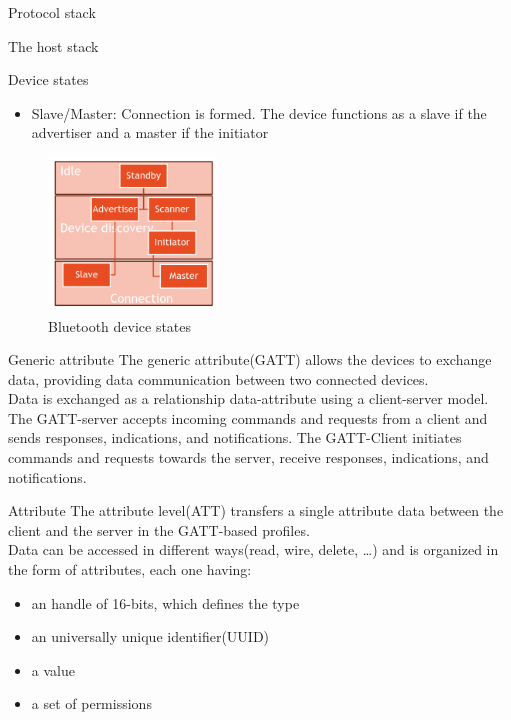 \begin{section}{Protocol stack}
\begin{subsection}{The host stack}
\begin{subsubsection}{Device states}
\begin{itemize}
        advertising device specifying the Connection Parameters
      \item Slave/Master: Connection is formed. The device functions as a slave if the advertiser
        and a master if the initiator
      \end{itemize}
      \begin{figure}[H]
        \centering
        \includegraphics[width=0.4\textwidth]{img/wireless/bluethooth device states.png}
        \caption{Bluetooth device states}
      \end{figure}

    \end{subsubsection}
    \begin{subsubsection}{Generic attribute}
      The generic attribute(GATT) allows the devices to exchange data, providing data communication
      between two connected devices.\\ 
      Data is exchanged as a relationship data-attribute using a client-server model. The GATT-server
      accepts incoming commands and requests from a client and sends responses, indications, and notifications.
      The GATT-Client initiates commands and requests towards the server, receive responses, indications, and notifications.
    \end{subsubsection}

    \begin{subsubsection}{Attribute}
      The attribute level(ATT) transfers a single attribute data between the client and the server
      in the GATT-based profiles.\\
      Data can be accessed in different ways(read, wire, delete, \dots) and is organized in the form
      of attributes, each one having:
      \begin{itemize}
        \item an handle of 16-bits, which defines the type 
        \item an universally unique identifier(UUID)
        \item a value
        \item a set of permissions
      \end{itemize}
    \end{subsubsection}


\end{subsection}
\end{section}
